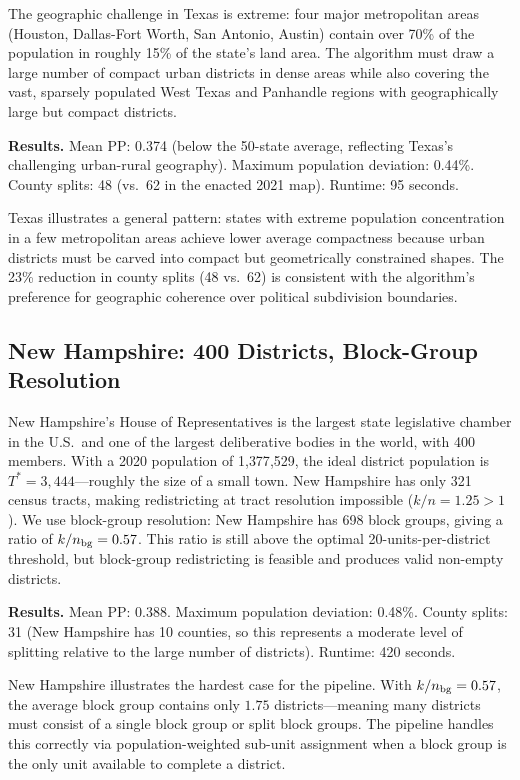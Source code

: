 The geographic challenge in Texas is extreme: four major metropolitan areas
(Houston, Dallas-Fort Worth, San Antonio, Austin) contain over 70\% of the
population in roughly 15\% of the state's land area. The algorithm must draw
a large number of compact urban districts in dense areas while also covering
the vast, sparsely populated West Texas and Panhandle regions with geographically
large but compact districts.

\textbf{Results.} Mean PP: 0.374 (below the 50-state average, reflecting Texas's
challenging urban-rural geography). Maximum population deviation: 0.44\%.
County splits: 48 (vs.\ 62 in the enacted 2021 map). Runtime: 95 seconds.

Texas illustrates a general pattern: states with extreme population concentration
in a few metropolitan areas achieve lower average compactness because urban
districts must be carved into compact but geometrically constrained shapes.
The 23\% reduction in county splits (48 vs.\ 62) is consistent with the
algorithm's preference for geographic coherence over political subdivision
boundaries.

\subsection{New Hampshire: 400 Districts, Block-Group Resolution}
\label{sec:cases:nh}

New Hampshire's House of Representatives is the largest state legislative
chamber in the U.S.\ and one of the largest deliberative bodies in the world,
with 400 members. With a 2020 population of 1{,}377{,}529, the ideal district
population is $T^* = 3{,}444$---roughly the size of a small town.
New Hampshire has only 321 census tracts, making redistricting at tract
resolution impossible ($k/n = 1.25 > 1$). We use block-group resolution:
New Hampshire has 698 block groups, giving a ratio of $k/n_{\rm bg} = 0.57$.
This ratio is still above the optimal 20-units-per-district threshold, but
block-group redistricting is feasible and produces valid non-empty districts.

\textbf{Results.} Mean PP: 0.388. Maximum population deviation: 0.48\%.
County splits: 31 (New Hampshire has 10 counties, so this represents a
moderate level of splitting relative to the large number of districts).
Runtime: 420 seconds.

New Hampshire illustrates the hardest case for the pipeline. With $k/n_{\rm bg} = 0.57$,
the average block group contains only $1.75$ districts---meaning many districts
must consist of a single block group or split block groups. The pipeline handles
this correctly via population-weighted sub-unit assignment when a block group
is the only unit available to complete a district.

